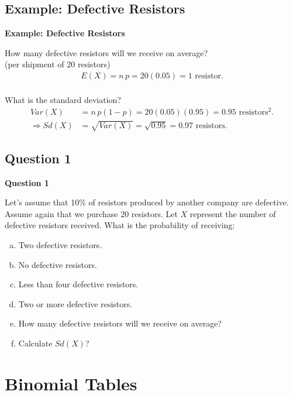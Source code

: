 \documentclass[compress]{beamer}        %
\makeatletter
\newcommand{\tcb}{\textcolor{beamer@blendedblue}}
\makeatother
\begin{document}
\subsection{Example: Defective Resistors}
\begin{frame}{\bf \tcb{Example: Defective Resistors}}

How many defective resistors will we receive on average?\\
(per shipment of 20 resistors)
\begin{align*}
E(X) = n\,p = 20 (0.05) = 1 \text{ resistor}.\\
\end{align*}

What is the standard deviation?
\begin{align*}
Var(X) &= n\,p(1-p) = 20 (0.05) (0.95) = 0.95 \text{ resistors$^2$}. \\[0.3cm]
\Rightarrow Sd(X) &= \sqrt{Var(X)} = \sqrt{0.95} = 0.97 \text{ resistors}.
\end{align*}

\end{frame}


\subsection{Question 1}
\begin{frame}{\bf \tcb{Question 1}}

Let's assume that 10\%  of resistors produced by another company are defective. Assume again that we purchase 20 resistors. Let $X$ represent the number of defective resistors received. What is the probability of receiving:\\[0.2cm]

\begin{enumerate}[a)]\itemsep0.2cm
\item Two defective resistors.
\item No defective resistors.
\item Less than four defective resistors.
\item Two or more defective resistors.
\item How many defective resistors will we receive on average?
\item Calculate $Sd(X)$?
\end{enumerate}


\end{frame}



\section{Binomial Tables}
\end{document}
